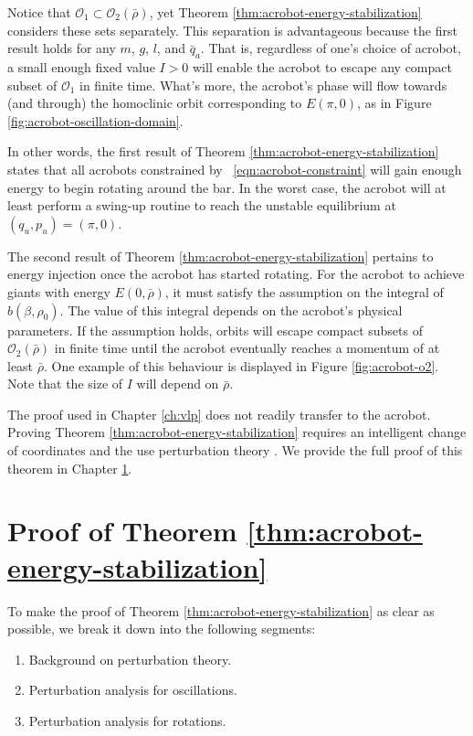 Notice that \(\mathcal{O}_1 \subset \mathcal{O}_2(\bar{\rho})\), yet
Theorem \ref{thm:acrobot-energy-stabilization} considers these sets separately.
This separation is advantageous because the first result holds for any
\(m\), \(g\), \(l\), and \(\bar{q}_a\). 
That is, regardless of one's choice of acrobot, 
a small enough fixed value \(I > 0\) will enable the acrobot to 
escape any compact subset of \(\mathcal{O}_1\) in finite time. 
What's more, the acrobot's phase will flow towards (and through) the homoclinic orbit
corresponding to \(E(\pi,0)\), as in Figure
\ref{fig:acrobot-oscillation-domain}.

In other words, the first result of Theorem
\ref{thm:acrobot-energy-stabilization} states that all acrobots constrained by
~\eqref{eqn:acrobot-constraint} will gain enough energy to begin rotating around
the bar.
In the worst case, the acrobot will at least perform a swing-up routine to reach
the unstable equilibrium at \((q_u,p_u) = (\pi,0)\).

The second result of Theorem
\ref{thm:acrobot-energy-stabilization} pertains to energy injection once the
acrobot has started rotating.
For the acrobot to achieve giants with energy
\(E(0,\bar{\rho})\), it must satisfy the assumption on the integral of
\(b(\beta,\rho_0)\).
The value of this integral depends on the acrobot's physical parameters.
If the assumption holds, orbits will escape compact subsets of
\(\mathcal{O}_2(\bar{\rho})\) in finite time until the acrobot eventually
reaches a momentum of at least \(\bar{\rho}\).
One example of this behaviour is displayed in Figure \ref{fig:acrobot-o2}.
Note that the size of \(I\) will depend on \(\bar{\rho}\).

The proof used in Chapter \ref{ch:vlp} does not
readily transfer to the acrobot.
Proving Theorem \ref{thm:acrobot-energy-stabilization} requires an intelligent
change of coordinates and the use perturbation
theory \cite{khalil_nonlinear}.
We provide the full proof of this theorem in Chapter \ref{sec:acrobot-proof}.
 
\section{Proof of Theorem \ref{thm:acrobot-energy-stabilization}}\label{sec:acrobot-proof}
To make the proof of Theorem \ref{thm:acrobot-energy-stabilization}
as clear as possible, we break it down into the following segments:
\begin{enumerate}
    \item Background on perturbation theory.
    \item Perturbation analysis for oscillations.
    \item Perturbation analysis for rotations.
\end{enumerate}

